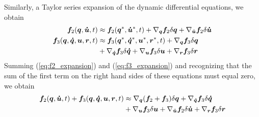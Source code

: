 \documentclass[smallcondensed,final]{svjour3}                     %
\begin{document}
Similarly, a Taylor series expansion of the dynamic differential equations, we
obtain
\begin{align}
  \label{eq:f2_expansion}
  \bm{f}_{2}(\bm{q}, \bm{\dot{u}}, t) &\approx
      \bm{f}_{2}(\bm{q}^*, \bm{\dot{u}}^*, t) +
      \nabla_{\bm{q}}\bm{f}_{2} \delta\bm{q}
      + \nabla_{\bm{\dot{u}}}\bm{f}_{2} \delta\bm{\dot{u}}\\
  \bm{f}_{3}(\bm{q}, \bm{\dot{q}}, \bm{u}, \bm{r}, t) &\approx
  \bm{f}_{3}(\bm{q}^*, \bm{\dot{q}}^*, \bm{u}^*, \bm{r}^*, t) +
  \nabla_{\bm{q}}\bm{f}_{3} \delta\bm{q}\notag\\
  \label{eq:f3_expansion}
  &+ \nabla_{\bm{\dot{q}}}\bm{f}_{3} \delta\bm{\dot{q}}
  + \nabla_{\bm{u}}\bm{f}_{3} \delta \bm{u}
  + \nabla_{\bm{r}}\bm{f}_{3} \delta\bm{r}
\end{align}
Summing (\ref{eq:f2_expansion}) and (\ref{eq:f3_expansion}) and recognizing
that the sum of the first term on the right hand sides of these equations must
equal zero, we obtain
\begin{align}
  \bm{f}_{2}(\bm{q}, \bm{\dot{u}}, t) + \bm{f}_{3}(\bm{q}, \bm{\dot{q}},
  \bm{u}, \bm{r}, t) &\approx \nabla_{\bm{q}}(\bm{f}_2 + \bm{f}_3)
  \delta\bm{q} + \nabla_{\bm{\dot{q}}}\bm{f}_{3} \delta\bm{\dot{q}}\notag\\
  \label{eq:f2_plus_f3_expansion}
  &+ \nabla_{\bm{u}}\bm{f}_{3} \delta\bm{u} +
  \nabla_{\bm{\dot{u}}}\bm{f}_{2} \delta\bm{\dot{u}} + \nabla_{\bm{r}}\bm{f}_{3} \delta\bm{r}
\end{align}
\end{document}
